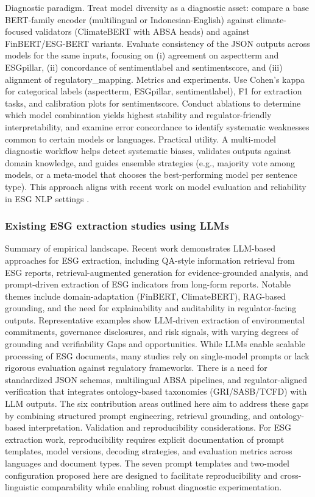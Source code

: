 Diagnostic paradigm. Treat model diversity as a diagnostic asset: compare a base BERT-family encoder (multilingual or Indonesian-English) against climate-focused validators (ClimateBERT with ABSA heads) and against FinBERT/ESG-BERT variants. Evaluate consistency of the JSON outputs across models for the same inputs, focusing on (i) agreement on aspectterm and ESGpillar, (ii) concordance of sentimentlabel and sentimentscore, and (iii) alignment of regulatory\_mapping.
Metrics and experiments. Use Cohen’s kappa for categorical labels (aspectterm, ESGpillar, sentimentlabel), F1 for extraction tasks, and calibration plots for sentimentscore. Conduct ablations to determine which model combination yields highest stability and regulator-friendly interpretability, and examine error concordance to identify systematic weaknesses common to certain models or languages.
Practical utility. A multi-model diagnostic workflow helps detect systematic biases, validates outputs against domain knowledge, and guides ensemble strategies (e.g., majority vote among models, or a meta-model that chooses the best-performing model per sentence type). This approach aligns with recent work on model evaluation and reliability in ESG NLP settings \cite{10.48550/arxiv.2510.22964,10.1145/3630106.3658966,10.48550/arxiv.2108.01415}.
\subsubsection{Existing ESG extraction studies using LLMs}

Summary of empirical landscape. Recent work demonstrates LLM-based approaches for ESG extraction, including QA-style information retrieval from ESG reports, retrieval-augmented generation for evidence-grounded analysis, and prompt-driven extraction of ESG indicators from long-form reports. Notable themes include domain-adaptation (FinBERT, ClimateBERT), RAG-based grounding, and the need for explainability and auditability in regulator-facing outputs. Representative examples show LLM-driven extraction of environmental commitments, governance disclosures, and risk signals, with varying degrees of grounding and verifiability \cite{10.48550/arxiv.2511.0155010.1609/aaai.v38i21.30574,10.48550/arxiv.2511.05524,10.48550/arxiv.2511.11885}
Gaps and opportunities. While LLMs enable scalable processing of ESG documents, many studies rely on single-model prompts or lack rigorous evaluation against regulatory frameworks. There is a need for standardized JSON schemas, multilingual ABSA pipelines, and regulator-aligned verification that integrates ontology-based taxonomies (GRI/SASB/TCFD) with LLM outputs. The six contribution areas outlined here aim to address these gaps by combining structured prompt engineering, retrieval grounding, and ontology-based interpretation.
Validation and reproducibility considerations. For ESG extraction work, reproducibility requires explicit documentation of prompt templates, model versions, decoding strategies, and evaluation metrics across languages and document types. The seven prompt templates and two-model configuration proposed here are designed to facilitate reproducibility and cross-linguistic comparability while enabling robust diagnostic experimentation.
